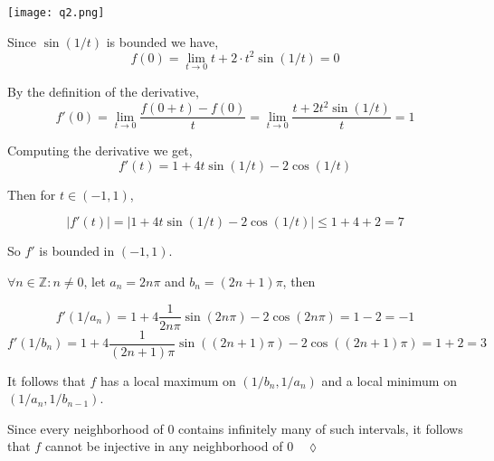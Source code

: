 \documentclass{article}
\newcommand\Z{\mathbb{Z}}
\begin{document}
\texttt{[image: q2.png]}

Since $\sin(1/t)$ is bounded we have,
\[f(0) = \lim_{t\rightarrow 0 } t + 2\cdot t^2 \sin(1/t) = 0\]

By the definition of the derivative,
\[f'(0) = \lim_{t\rightarrow 0} \frac{f(0+t) -f(0)}{t} =
  \lim_{t\rightarrow 0} \frac{t +2t^2 \sin(1/t)}{t} = 1\]

Computing the derivative we get,
\[f'(t) = 1 + 4t\sin(1/t) -2\cos(1/t)\]

Then for $t \in (-1,1)$,

\begin{equation*}|f'(t)| = |1 + 4t\sin(1/t) -2\cos(1/t)|
  \leq 1 +4+2 = 7
\end{equation*}

So $f'$ is bounded in $(-1,1)$.

$\forall n\in \Z: n\neq 0$, let $a_n  = 2n\pi$ and $b_n = (2n+1)\pi$, then

\[f'(1/a_n) = 1 + 4\frac{1}{2n\pi}\sin(2n\pi) -2\cos(2n\pi) = 1 -
  2 = -1\]
\[f'(1/b_n) = 1 + 4\frac{1}{(2n+1)\pi}\sin((2n+1)\pi)
  -2\cos((2n+1)\pi) = 1 + 2 =3\]

It follows that $f$ has a local
maximum on $(1/b_n,1/a_n)$ and a local minimum on $(1/a_n,1/b_{n-1})$.

Since every neighborhood of $0$ contains infinitely many of such
intervals, it follows that $f$ cannot be injective in any neighborhood
of $0\quad \lozenge$
\end{document}
